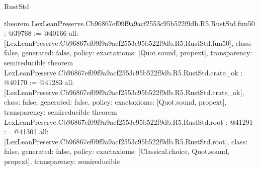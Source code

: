 \begin{lexlean}{RustStd}
\begin{coremodule}
{}
theorem LexLeanPreserve.Cb96867ef09f9a9acf2553c95b522f9db.R5.RustStd.fun50 : @39768 := @40166 {
  all: [LexLeanPreserve.Cb96867ef09f9a9acf2553c95b522f9db.R5.RustStd.fun50],
  class: false,
  generated: false,
  policy: exact{axioms: [Quot.sound, propext]},
  transparency: semireducible
}
theorem LexLeanPreserve.Cb96867ef09f9a9acf2553c95b522f9db.R5.RustStd.crate_ok : @40170 := @41283 {
  all: [LexLeanPreserve.Cb96867ef09f9a9acf2553c95b522f9db.R5.RustStd.crate_ok],
  class: false,
  generated: false,
  policy: exact{axioms: [Quot.sound, propext]},
  transparency: semireducible
}
theorem LexLeanPreserve.Cb96867ef09f9a9acf2553c95b522f9db.R5.RustStd.root : @41291 := @41301 {
  all: [LexLeanPreserve.Cb96867ef09f9a9acf2553c95b522f9db.R5.RustStd.root],
  class: false,
  generated: false,
  policy: exact{axioms: [Classical.choice, Quot.sound, propext]},
  transparency: semireducible
}


\end{coremodule}
\end{lexlean}
